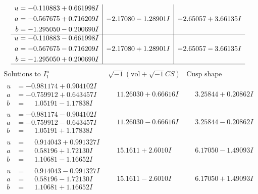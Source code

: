 \documentclass[1p]{elsarticle_modified}
\theoremstyle{definition}
\newcommand{\I}{\sqrt{-1}}
\begin{document}
$$\begin{array}{c|c|c}
\begin{aligned}
u &= -0.110883 + 0.661998 I \\
a &= -0.567675 + 0.716209 I \\
b &= -1.295050 - 0.200690 I\end{aligned}
 & -2.17080 - 1.28901 I & -2.65057 + 3.66135 I \\ \hline\begin{aligned}
u &= -0.110883 - 0.661998 I \\
a &= -0.567675 - 0.716209 I \\
b &= -1.295050 + 0.200690 I\end{aligned}
 & -2.17080 + 1.28901 I & -2.65057 - 3.66135 I\\
 \hline 
 \end{array}$$\newpage$$\begin{array}{c|c|c}  
\text{Solutions to }I^u_{1}& \I (\text{vol} + \sqrt{-1}CS) & \text{Cusp shape}\\
 \hline 
\begin{aligned}
u &= -0.981174 + 0.904102 I \\
a &= -0.759912 + 0.643457 I \\
b &= \phantom{-}1.05191 - 1.17838 I\end{aligned}
 & \phantom{-}11.26030 + 0.66616 I & \phantom{-}3.25844 + 0.20862 I \\ \hline\begin{aligned}
u &= -0.981174 - 0.904102 I \\
a &= -0.759912 - 0.643457 I \\
b &= \phantom{-}1.05191 + 1.17838 I\end{aligned}
 & \phantom{-}11.26030 - 0.66616 I & \phantom{-}3.25844 - 0.20862 I \\ \hline\begin{aligned}
u &= \phantom{-}0.914043 + 0.991327 I \\
a &= \phantom{-}0.58196 + 1.72130 I \\
b &= \phantom{-}1.10681 - 1.16652 I\end{aligned}
 & \phantom{-}15.1611 + 2.6010 I & \phantom{-}6.17050 - 1.49093 I \\ \hline\begin{aligned}
u &= \phantom{-}0.914043 - 0.991327 I \\
a &= \phantom{-}0.58196 - 1.72130 I \\
b &= \phantom{-}1.10681 + 1.16652 I\end{aligned}
 & \phantom{-}15.1611 - 2.6010 I & \phantom{-}6.17050 + 1.49093 I \\ \hline\begin{aligned}

\end{aligned}
\end{array}$$
\end{document}
